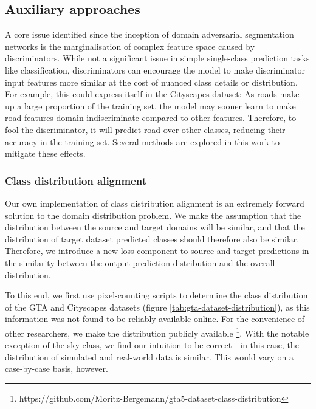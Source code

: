\documentclass[a4paper,12pt]{report}
\begin{document}
\subsection{Auxiliary approaches}
A core issue identified since the inception of domain adversarial segmentation networks \cite{hoffman_fcns_2016} is the marginalisation of complex feature space caused by discriminators. While not a significant issue in simple single-class prediction tasks like classification, discriminators can encourage the model to make discriminator input features more similar at the cost of nuanced class details or distribution. For example, this could express itself in the Cityscapes dataset: As roads make up a large proportion of the training set, the model may sooner learn to make road features domain-indiscriminate compared to other features. Therefore, to fool the discriminator, it will predict road over other classes, reducing their accuracy in the training set. Several methods are explored in this work to mitigate these effects.

\subsubsection{Class distribution alignment}
Our own implementation of class distribution alignment is an extremely forward solution to the domain distribution problem. We make the assumption that the distribution between the source and target domains will be similar, and that the distribution of target dataset predicted classes should therefore also be similar. Therefore, we introduce a new loss component to source and target predictions in the similarity between the output prediction distribution and the overall distribution.

To this end, we first use pixel-counting scripts to determine the class distribution of the GTA and Cityscapes datasets (figure \ref{tab:gta-dataset-distribution}), as this information was not found to be reliably available online. For the convenience of other researchers, we make the distribution publicly available \footnote{https://github.com/Moritz-Bergemann/gta5-dataset-class-distribution}. With the notable exception of the sky class, we find our intuition to be correct - in this case, the distribution of simulated and real-world data is similar. This would vary on a case-by-case basis, however.
\end{document}
